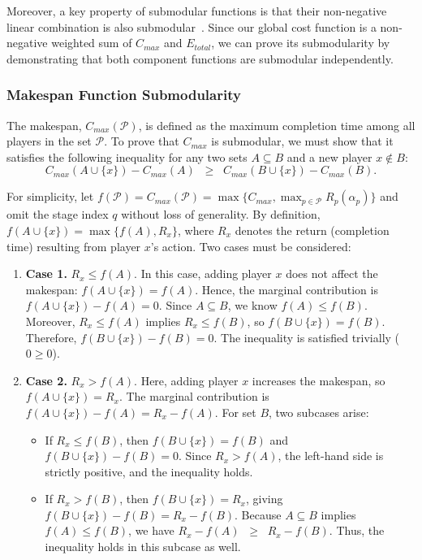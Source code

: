 \documentclass[preprint, 3p, review, 12pt]{elsarticle}
\begin{document}
Moreover, a key property of submodular functions is that their non-negative linear combination is also submodular~\cite{Nemhauser, MAL-039}. Since our global cost function is a non-negative weighted sum of $C_{max}$ and $E_{total}$, we can prove its submodularity by demonstrating that both component functions are submodular independently.

\subsubsection{Makespan Function Submodularity}
The makespan, $C_{max}(\mathcal{P})$, is defined as the maximum completion time among all players in the set $\mathcal{P}$. To prove that $C_{max}$ is submodular, we must show that it satisfies the following inequality for any two sets $A \subseteq B$ and a new player $x \notin B$:
\[
C_{max}(A \cup \{x\}) - C_{max}(A) \;\;\ge\;\; C_{max}(B \cup \{x\}) - C_{max}(B).
\]

For simplicity, let $f(\mathcal{P}) = C_{max}(\mathcal{P}) = \max\!\big\{ C_{max}, \max_{p \in \mathcal{P}} R_p(\alpha_p) \big\}$ and omit the stage index $q$ without loss of generality. By definition, $f(A \cup \{x\}) = \max\{ f(A), R_x \}$, where $R_x$ denotes the return (completion time) resulting from player $x$'s action. Two cases must be considered:
\begin{enumerate}
    \item \textbf{Case 1.} $R_x \le f(A)$.  
    In this case, adding player $x$ does not affect the makespan: $f(A \cup \{x\}) = f(A)$. Hence, the marginal contribution is $f(A \cup \{x\}) - f(A) = 0$. Since $A \subseteq B$, we know $f(A) \le f(B)$. Moreover, $R_x \le f(A)$ implies $R_x \le f(B)$, so $f(B \cup \{x\}) = f(B)$. Therefore, $f(B \cup \{x\}) - f(B) = 0$. The inequality is satisfied trivially ($0 \ge 0$).

    \item \textbf{Case 2.} $R_x > f(A)$.  
    Here, adding player $x$ increases the makespan, so $f(A \cup \{x\}) = R_x$. The marginal contribution is $f(A \cup \{x\}) - f(A) = R_x - f(A)$. For set $B$, two subcases arise:
    \begin{itemize}
        \item If $R_x \le f(B)$, then $f(B \cup \{x\}) = f(B)$ and $f(B \cup \{x\}) - f(B) = 0$. Since $R_x > f(A)$, the left-hand side is strictly positive, and the inequality holds.
        \item If $R_x > f(B)$, then $f(B \cup \{x\}) = R_x$, giving $f(B \cup \{x\}) - f(B) = R_x - f(B)$. Because $A \subseteq B$ implies $f(A) \le f(B)$, we have $R_x - f(A) \;\;\ge\;\; R_x - f(B)$. Thus, the inequality holds in this subcase as well.
    \end{itemize}
\end{enumerate}
\end{document}

